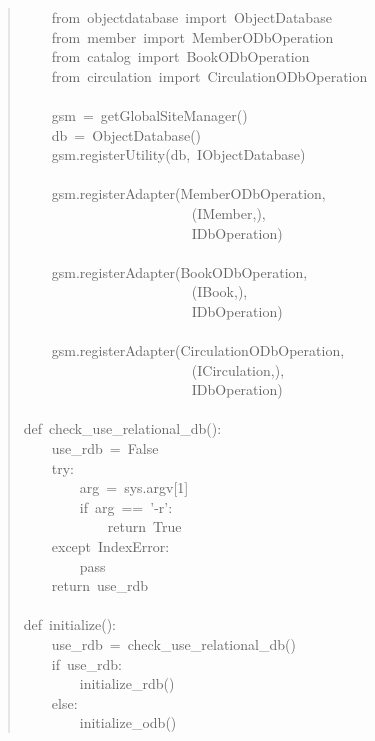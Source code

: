 \documentclass[14pt,a4paper,openany,twoside,final]{extbook}
\begin{document}
\begin{quote}
{~~~~from~objectdatabase~import~ObjectDatabase\\
~~~~from~member~import~MemberODbOperation\\
~~~~from~catalog~import~BookODbOperation\\
~~~~from~circulation~import~CirculationODbOperation\\
~\\
~~~~gsm~=~getGlobalSiteManager()\\
~~~~db~=~ObjectDatabase()\\
~~~~gsm.registerUtility(db,~IObjectDatabase)\\
~\\
~~~~gsm.registerAdapter(MemberODbOperation,\\
~~~~~~~~~~~~~~~~~~~~~~~~(IMember,),\\
~~~~~~~~~~~~~~~~~~~~~~~~IDbOperation)\\
~\\
~~~~gsm.registerAdapter(BookODbOperation,\\
~~~~~~~~~~~~~~~~~~~~~~~~(IBook,),\\
~~~~~~~~~~~~~~~~~~~~~~~~IDbOperation)\\
~\\
~~~~gsm.registerAdapter(CirculationODbOperation,\\
~~~~~~~~~~~~~~~~~~~~~~~~(ICirculation,),\\
~~~~~~~~~~~~~~~~~~~~~~~~IDbOperation)\\
~\\
def~check\_use\_relational\_db():\\
~~~~use\_rdb~=~False\\
~~~~try:\\
~~~~~~~~arg~=~sys.argv{[}1{]}\\
~~~~~~~~if~arg~==~'-r':\\
~~~~~~~~~~~~return~True\\
~~~~except~IndexError:\\
~~~~~~~~pass\\
~~~~return~use\_rdb\\
~\\
def~initialize():\\
~~~~use\_rdb~=~check\_use\_relational\_db()\\
~~~~if~use\_rdb:\\
~~~~~~~~initialize\_rdb()\\
~~~~else:\\
~~~~~~~~initialize\_odb()
}
\end{quote}
\end{document}
